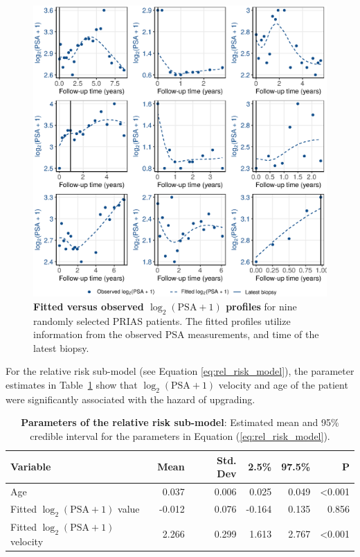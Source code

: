 \begin{figure}
\centerline{\includegraphics[width=\columnwidth]{images/fitted_9subject_psa.eps}}
\caption{\textbf{Fitted versus observed ${\log_2 (\mbox{PSA} + 1)}$ profiles} for nine randomly selected PRIAS patients. The fitted profiles utilize information from the observed PSA measurements, and time of the latest biopsy.}
\label{fig:fitted_9subject_psa}
\end{figure}

For the relative risk sub-model (see Equation \ref{eq:rel_risk_model}), the parameter estimates in Table~\ref{tab:PSA_survival} show that ${\log_2 (\mbox{PSA} + 1)}$ velocity and age of the patient were significantly associated with the hazard of upgrading.

\begin{table}
\small\sf\centering
\caption{\textbf{Parameters of the relative risk sub-model}: Estimated mean and 95\% credible interval for the parameters in Equation (\ref{eq:rel_risk_model}).}
\label{tab:PSA_survival}
\begin{tabular}{lrrrrr}
\hline
Variable                      & Mean   & Std. Dev & 2.5\%  & 97.5\%                 & P              \\
\hline
Age                      & 0.037    & 0.006 & 0.025  & 0.049  & \textless0.001 \\
Fitted $\log_2 (\mbox{PSA} + 1)$ value            & -0.012   & 0.076 & -0.164 & 0.135  & 0.856 \\
Fitted $\log_2 (\mbox{PSA} + 1)$ velocity             & 2.266    & 0.299 & 1.613  & 2.767  & \textless0.001   \\
\hline
\end{tabular}
\end{table}

